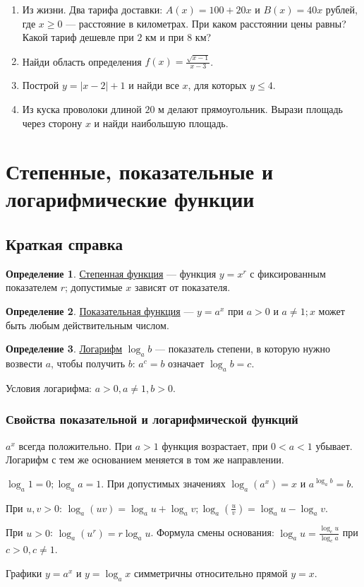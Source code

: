 \documentclass[12pt,a4paper]{article}
\theoremstyle{definition}
\newtheorem{definition}{Определение}[section]
\theoremstyle{plain}
\theoremstyle{remark}
\newcommand{\term}[1]{\uline{#1}}
\newcommand{\starmark}{\ensuremath{{}^{\ast}}}
\begin{document}
\begin{enumerate}[label=\thesection.\arabic*.,leftmargin=2.8em,itemsep=12pt]
\item Из жизни. Два тарифа доставки: \(A (x) = 100 + 20 x\) и \(B (x) = 40 x\) рублей, где \(x \ge  0\) — расстояние в километрах. При каком расстоянии цены равны? Какой тариф дешевле при \(2\) км и при \(8\) км?
\item[\textbf{11.16.}\starmark] Найди область определения \(f (x) = \frac{\sqrt{x - 1}}{x - 3}\).
\item[\textbf{11.17.}\starmark] Построй \(y = | x - 2 | + 1\) и найди все \(x\), для которых \(y \le  4\).
\item[\textbf{11.18.}\starmark] Из куска проволоки длиной \(20\) м делают прямоугольник. Вырази площадь через сторону \(x\) и найди наибольшую площадь.
\end{enumerate}
\clearpage
\section{Степенные, показательные и логарифмические функции}
\subsection*{Краткая справка}
\begin{definition}\term{Степенная функция} — функция \(y = x^{r}\) с фиксированным показателем \(r\); допустимые \(x\) зависят от показателя.\end{definition}
\begin{definition}\term{Показательная функция} — \(y = a^{x}\) при \(a > 0\) и \(a \ne  1;\allowbreak x\) может быть любым действительным числом.\end{definition}
\begin{definition}\term{Логарифм} \(\log _{a} b\) — показатель степени, в которую нужно возвести \(a\), чтобы получить \(b\): \(a^{c} = b\) означает \(\log _{a} b = c\).\end{definition}
Условия логарифма: \(a > 0,\allowbreak a \ne  1,\allowbreak b > 0\).\par
\subsubsection*{Свойства показательной и логарифмической функций}
\(a^{x}\) всегда положительно. При \(a > 1\) функция возрастает, при \(0 < a < 1\) убывает. Логарифм с тем же основанием меняется в том же направлении.\par
\(\log _{a} 1 = 0;\allowbreak \log _{a} a = 1\). При допустимых значениях \(\log _{a} (a^{x}) = x\) и \(a^{\log _{a} b} = b\).\par
При \(u,\allowbreak v > 0\): \(\log _{a} (uv) = \log _{a} u + \log _{a} v;\allowbreak \log _{a} (\frac{u}{v}) = \log _{a} u - \log _{a} v\).\par
При \(u > 0\): \(\log _{a} (u^{r}) = r \log _{a} u\). Формула смены основания: \(\log _{a} u = \frac{\log _{c} u}{\log _{c} a}\) при \(c > 0,\allowbreak c \ne  1\).\par
Графики \(y = a^{x}\) и \(y = \log _{a} x\) симметричны относительно прямой \(y = x\).\par
\end{document}
